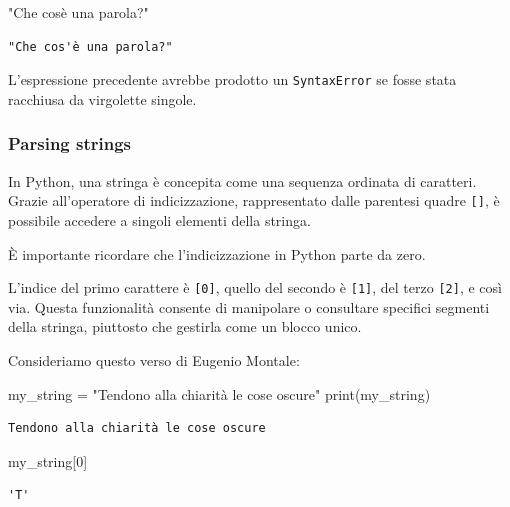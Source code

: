 \documentclass[
  letterpaper,
  krantz2]{{[}./krantz{]}}
\newenvironment{Shaded}{\begin{snugshade}}{\end{snugshade}}
\newcommand{\BuiltInTok}[1]{\textcolor[rgb]{0.00,0.23,0.31}{#1}}
\newcommand{\CommentTok}[1]{\textcolor[rgb]{0.37,0.37,0.37}{#1}}
\newcommand{\DecValTok}[1]{\textcolor[rgb]{0.68,0.00,0.00}{#1}}
\newcommand{\NormalTok}[1]{\textcolor[rgb]{0.00,0.23,0.31}{#1}}
\newcommand{\OperatorTok}[1]{\textcolor[rgb]{0.37,0.37,0.37}{#1}}
\newcommand{\StringTok}[1]{\textcolor[rgb]{0.13,0.47,0.30}{#1}}
\begin{document}
\begin{Shaded}
\begin{Highlighting}[]
\CommentTok{"Che cos\textquotesingle{}è una parola?"}
\end{Highlighting}
\end{Shaded}

\begin{verbatim}
"Che cos'è una parola?"
\end{verbatim}

L'espressione precedente avrebbe prodotto un \texttt{SyntaxError} se
fosse stata racchiusa da virgolette singole.

\subsubsection{Parsing strings}\label{parsing-strings}

In Python, una stringa è concepita come una sequenza ordinata di
caratteri. Grazie all'operatore di indicizzazione, rappresentato dalle
parentesi quadre \texttt{{[}{]}}, è possibile accedere a singoli
elementi della stringa.

È importante ricordare che l'indicizzazione in Python parte da zero.

L'indice del primo carattere è \texttt{{[}0{]}}, quello del secondo è
\texttt{{[}1{]}}, del terzo \texttt{{[}2{]}}, e così via. Questa
funzionalità consente di manipolare o consultare specifici segmenti
della stringa, piuttosto che gestirla come un blocco unico.

Consideriamo questo verso di Eugenio Montale:

\begin{Shaded}
\begin{Highlighting}[]
\NormalTok{my\_string }\OperatorTok{=} \StringTok{"Tendono alla chiarità le cose oscure"}
\BuiltInTok{print}\NormalTok{(my\_string)}
\end{Highlighting}
\end{Shaded}

\begin{verbatim}
Tendono alla chiarità le cose oscure
\end{verbatim}

\begin{Shaded}
\begin{Highlighting}[]
\NormalTok{my\_string[}\DecValTok{0}\NormalTok{]}
\end{Highlighting}
\end{Shaded}

\begin{verbatim}
'T'
\end{verbatim}
\end{document}
